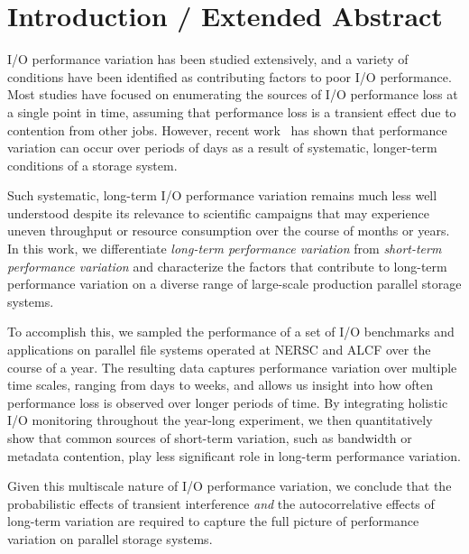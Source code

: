 \section{Introduction / Extended Abstract}

I/O performance variation has been studied extensively, and a variety of conditions have been identified as contributing factors to poor I/O performance.  Most studies have focused on enumerating the sources of I/O performance loss at a single point in time, assuming that performance loss is a transient effect due to contention from other jobs.  However, recent work~\cite{Lockwood2017} has shown that performance variation can occur over periods of days as a result of systematic, longer-term conditions of a storage system.

Such systematic, long-term I/O performance variation remains much less well understood despite its relevance to scientific campaigns that may experience uneven throughput or resource consumption over the course of months or years.  In this work, we differentiate \emph{long-term performance variation} from \emph{short-term performance variation} and characterize the factors that contribute to long-term performance variation on a diverse range of large-scale production parallel storage systems.

To accomplish this, we sampled the performance of a set of I/O benchmarks and applications on parallel file systems operated at NERSC and ALCF over the course of a year.  The resulting data captures performance variation over multiple time scales, ranging from days to weeks, and allows us insight into how often performance loss is observed over longer periods of time.  By integrating holistic I/O monitoring throughout the year-long experiment, we then quantitatively show that common sources of short-term variation, such as bandwidth or metadata contention, play less significant role in long-term performance variation.

Given this multiscale nature of I/O performance variation, we conclude that the probabilistic effects of transient interference \emph{and} the autocorrelative effects of long-term variation are required to capture the full picture of performance variation on parallel storage systems.